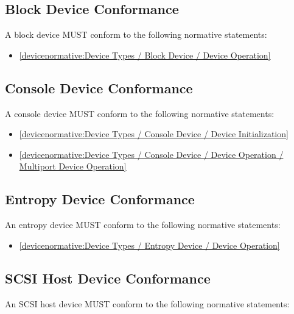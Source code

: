 \subsection{Block Device Conformance}\label{sec:Conformance / Device Conformance / Block Device Conformance}

A block device MUST conform to the following normative statements:

\begin{itemize}
\item \ref{devicenormative:Device Types / Block Device / Device Operation}
\end{itemize}

\subsection{Console Device Conformance}\label{sec:Conformance / Device Conformance / Console Device Conformance}

A console device MUST conform to the following normative statements:

\begin{itemize}
\item \ref{devicenormative:Device Types / Console Device / Device Initialization}
\item \ref{devicenormative:Device Types / Console Device / Device Operation / Multiport Device Operation}
\end{itemize}

\subsection{Entropy Device Conformance}\label{sec:Conformance / Device Conformance / Entropy Device Conformance}

An entropy device MUST conform to the following normative statements:

\begin{itemize}
\item \ref{devicenormative:Device Types / Entropy Device / Device Operation}
\end{itemize}

\subsection{SCSI Host Device Conformance}\label{sec:Conformance / Device Conformance / SCSI Host Device Conformance}

An SCSI host device MUST conform to the following normative statements:

